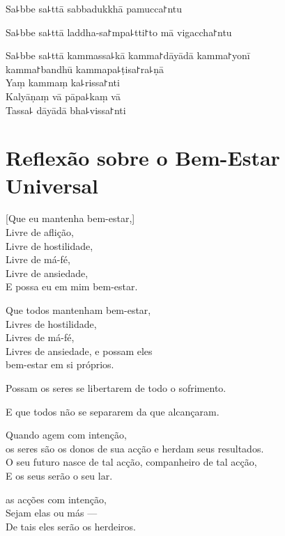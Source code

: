 Sa꜕bbe sa꜕ttā sabbadukkhā pamucca꜓ntu

Sa꜕bbe sa꜕ttā laddha-sa꜓mpa꜕tti꜓to mā vigaccha꜓ntu

Sa꜕bbe sa꜕ttā kammassa꜕kā kamma꜓dāyādā kamma꜓yonī\\
\vin kamma꜓bandhū kammapa꜕ṭisa꜓ra꜕ṇā\\
Yaṃ kammaṃ ka꜕rissa꜓nti\\
Kalyāṇaṃ vā pāpa꜕kaṃ vā\\
Tassa꜕ dāyādā bha꜕vissa꜓nti

\chapter[Bem-Estar Universal]{Reflexão sobre o Bem-Estar Universal}


\begin{leader}
\end{leader}

[Que eu mantenha bem-estar,]\\
Livre de aflição,\\
Livre de hostilidade,\\
Livre de má-fé,\\
Livre de ansiedade,\\
E possa eu  em mim bem-estar.

Que todos mantenham bem-estar,\\
Livres de hostilidade,\\
Livres de má-fé,\\
Livres de ansiedade, e possam eles\\
 bem-estar em si próprios.

Possam  os seres se libertarem de todo o sofrimento.

E que todos não se separarem da  que alcançaram.

Quando agem com intenção,\\
 os seres são os donos de sua acção e herdam seus resultados.\\
O seu futuro nasce de tal acção, companheiro de tal acção,\\
E os seus  serão o seu lar.

 as acções com intenção,\\
Sejam elas  ou más ---\\
De tais  eles serão os herdeiros.

